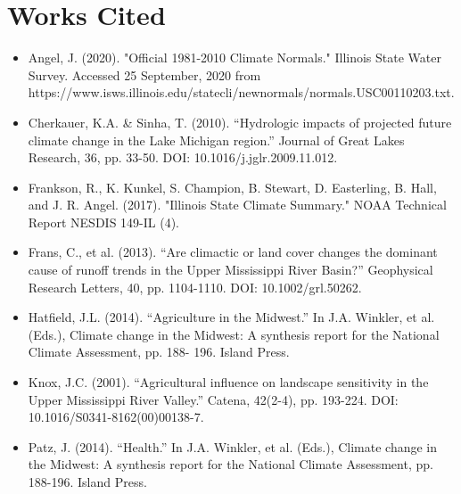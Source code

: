 \documentclass{article}\usepackage[]{graphicx}\usepackage[]{color}
\begin{document}
\section*{Works Cited}

\begin{itemize}
  \item Angel, J. (2020).  "Official 1981-2010 Climate Normals." Illinois State Water Survey.  Accessed 25 September, 2020 from https://www.isws.illinois.edu/statecli/newnormals/normals.USC00110203.txt. 
  \item Cherkauer, K.A. \& Sinha, T. (2010). “Hydrologic impacts of projected future climate change in 	the Lake Michigan region.”  Journal of Great Lakes Research, 36, pp. 33-50.  DOI: 	10.1016/j.jglr.2009.11.012.
  \item Frankson, R., K. Kunkel, S. Champion, B. Stewart, D. Easterling, B. Hall, and J. R. Angel. (2017). "Illinois State Climate Summary." NOAA Technical Report NESDIS 149-IL (4).
  \item Frans, C., et al. (2013).  “Are climactic or land cover changes the dominant cause of runoff 	trends in the Upper Mississippi River Basin?” Geophysical Research Letters, 40, pp. 	1104-1110.  DOI: 10.1002/grl.50262. 
  \item Hatfield, J.L. (2014).  “Agriculture in the Midwest.”  In J.A. Winkler, et al. (Eds.), Climate 	change in the Midwest: A synthesis report for the National Climate Assessment, pp. 188-	196.  Island Press.
  \item Knox, J.C. (2001).  “Agricultural influence on landscape sensitivity in the Upper Mississippi 	River Valley.”  Catena, 42(2-4), pp. 193-224.  DOI: 10.1016/S0341-8162(00)00138-7.
  \item Patz, J. (2014).  “Health.”  In J.A. Winkler, et al. (Eds.), Climate change in the Midwest: A 	synthesis report for the National Climate Assessment, pp. 188-196.  Island Press.
\end{itemize}
\end{document}
